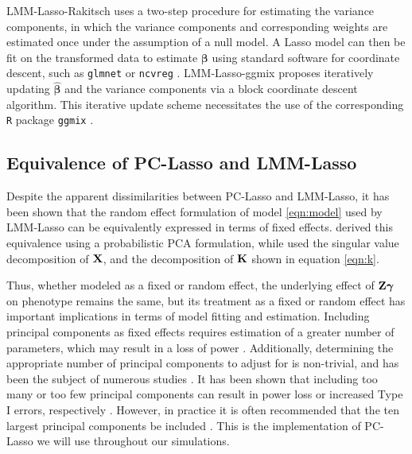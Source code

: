 LMM-Lasso-Rakitsch \cite{Rakitsch2012} uses a two-step procedure for estimating the variance components, in which the variance components and corresponding weights are estimated once under the assumption of a null model. A Lasso model can then be fit on the transformed data to estimate $\boldsymbol{\beta}$ using standard software for coordinate descent, such as \texttt{glmnet}  or \texttt{ncvreg} . LMM-Lasso-ggmix \cite{bhatnagar2019simultaneous} proposes iteratively updating $\widehat{\boldsymbol{\beta}}$ and the variance components via a block coordinate descent algorithm. This iterative update scheme necessitates the use of the corresponding \texttt{R} package \texttt{ggmix} \cite{bhatnagar2019simultaneous}. 

\subsubsection{}


\subsection{Equivalence of PC-Lasso and LMM-Lasso}

Despite the apparent dissimilarities between PC-Lasso and LMM-Lasso, it has been shown that the random effect formulation of model \ref{eqn:model} used by LMM-Lasso can be equivalently expressed in terms of fixed effects. \cite{zhang2015principal} derived this equivalence using a probabilistic PCA formulation, while \cite{hoffman2013correcting} used the singular value decomposition of $\textbf{X}$, and the decomposition of $\textbf{K}$ shown in equation \ref{eqn:k}. 

Thus, whether modeled as a fixed or random effect, the underlying effect of $\textbf{Z} \boldsymbol{\gamma}$ on phenotype remains the same, but its treatment as a fixed or random effect has important implications in terms of model fitting and estimation. Including principal components as fixed effects requires estimation of a greater number of parameters, which may result in a loss of power \cite{zhang2015principal}. Additionally, determining the appropriate number of principal components to adjust for is non-trivial, and has been the subject of numerous studies \cite{patterson2006population, zhao2018practical}. It has been shown that including too many or too few principal components can result in power loss or increased Type I errors, respectively \cite{zhang2015principal}. However, in practice it is often recommended that the ten largest principal components be included \cite{zhao2018practical}. This is the implementation of PC-Lasso we will use throughout our simulations.


